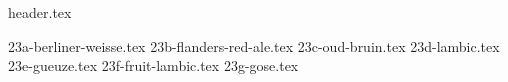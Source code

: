 \clearpage
{}
\divisorLine
{header.tex}
\begin{multicols}{2}
{23a-berliner-weisse.tex}
{23b-flanders-red-ale.tex}
{23c-oud-bruin.tex}
{23d-lambic.tex}
{23e-gueuze.tex}
{23f-fruit-lambic.tex}
{23g-gose.tex}
\end{multicols}